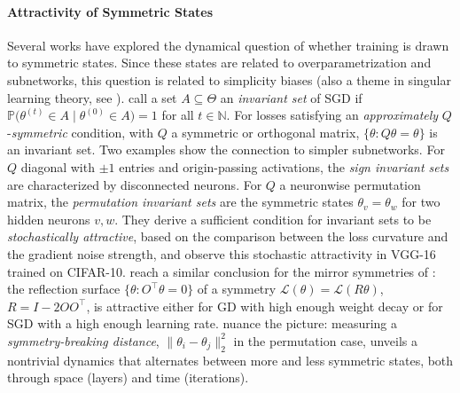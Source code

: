 \documentclass[mathematics,review,submit,moreauthors]{Definitions/mdpi}
\begin{document}
\paragraph{Attractivity of Symmetric States}
Several works have explored the dynamical question of whether training is drawn to symmetric states.
Since these states are related to overparametrization and subnetworks, this question is related to simplicity biases (also a theme in singular learning theory, see ). 
\citet{chen2024jsm} call a set $A\subseteq\Theta$ an \emph{invariant set} of SGD if $\mathbb{P}\big(\theta^{(t)}\in A \mid \theta^{(0)}\in A\big)=1$ for all $t\in\mathbb{N}$.
For losses satisfying an \emph{approximately} $Q$-\emph{symmetric} condition, with $Q$ a symmetric or orthogonal matrix, $\{\theta : Q\theta=\theta\}$ is an invariant set.
Two examples show the connection to simpler subnetworks.
For $Q$ diagonal with $\pm1$ entries and origin-passing activations, the \emph{sign invariant sets} are characterized by disconnected neurons.
For $Q$ a neuronwise permutation matrix, the \emph{permutation invariant sets} are the symmetric states $\theta_v=\theta_w$ for two hidden neurons $v,w$.
They derive a sufficient condition for invariant sets to be \emph{stochastically attractive}, based on the comparison between the loss curvature and the gradient noise strength, and observe this stochastic attractivity in VGG-16 trained on CIFAR-10.
\citet{ziyin2024} reach a similar conclusion for the mirror symmetries of : the reflection surface $\{\theta : O^{\top}\theta=0\}$ of a symmetry $\mathcal{L}(\theta)=\mathcal{L}(R\theta)$, $R=I-2OO^{\top}$, is attractive either for GD with high enough weight decay or for SGD with a high enough learning rate.
\citet{ziyin2025} nuance the picture: measuring a \emph{symmetry-breaking distance}, $\lVert\theta_i-\theta_j\rVert_2^2$ in the permutation case, unveils a nontrivial dynamics that alternates between more and less symmetric states, both through space (layers) and time (iterations).
\end{document}
